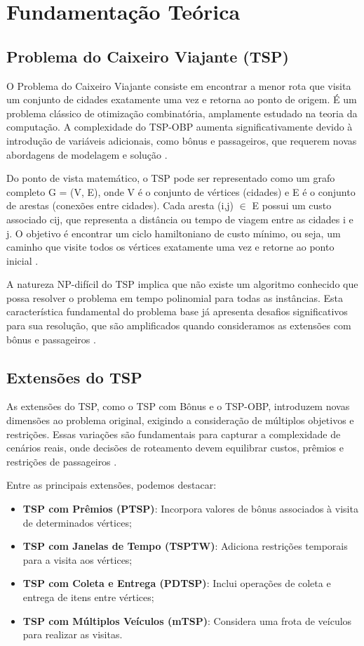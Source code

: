 \documentclass[12pt, a4paper]{report}
\begin{document}
\chapter{Fundamentação Teórica}

\section{Problema do Caixeiro Viajante (TSP)}
O Problema do Caixeiro Viajante consiste em encontrar a menor rota que visita um conjunto de cidades exatamente uma vez e retorna ao ponto de origem. É um problema clássico de otimização combinatória, amplamente estudado na teoria da computação. A complexidade do TSP-OBP aumenta significativamente devido à introdução de variáveis adicionais, como bônus e passageiros, que requerem novas abordagens de modelagem e solução \cite{lopesfilho2019}.

Do ponto de vista matemático, o TSP pode ser representado como um grafo completo G = (V, E), onde V é o conjunto de vértices (cidades) e E é o conjunto de arestas (conexões entre cidades). Cada aresta (i,j) $\in$ E possui um custo associado cij, que representa a distância ou tempo de viagem entre as cidades i e j. O objetivo é encontrar um ciclo hamiltoniano de custo mínimo, ou seja, um caminho que visite todos os vértices exatamente uma vez e retorne ao ponto inicial \cite{salvador}.

A natureza NP-difícil do TSP implica que não existe um algoritmo conhecido que possa resolver o problema em tempo polinomial para todas as instâncias. Esta característica fundamental do problema base já apresenta desafios significativos para sua resolução, que são amplificados quando consideramos as extensões com bônus e passageiros \cite{gomes2018}.

\section{Extensões do TSP}
As extensões do TSP, como o TSP com Bônus e o TSP-OBP, introduzem novas dimensões ao problema original, exigindo a consideração de múltiplos objetivos e restrições. Essas variações são fundamentais para capturar a complexidade de cenários reais, onde decisões de roteamento devem equilibrar custos, prêmios e restrições de passageiros \cite{carvalho2022}.

Entre as principais extensões, podemos destacar:

\begin{itemize}
    \item \textbf{TSP com Prêmios (PTSP)}: Incorpora valores de bônus associados à visita de determinados vértices;
    \item \textbf{TSP com Janelas de Tempo (TSPTW)}: Adiciona restrições temporais para a visita aos vértices;
    \item \textbf{TSP com Coleta e Entrega (PDTSP)}: Inclui operações de coleta e entrega de itens entre vértices;
    \item \textbf{TSP com Múltiplos Veículos (mTSP)}: Considera uma frota de veículos para realizar as visitas.
\end{itemize}
\end{document}
